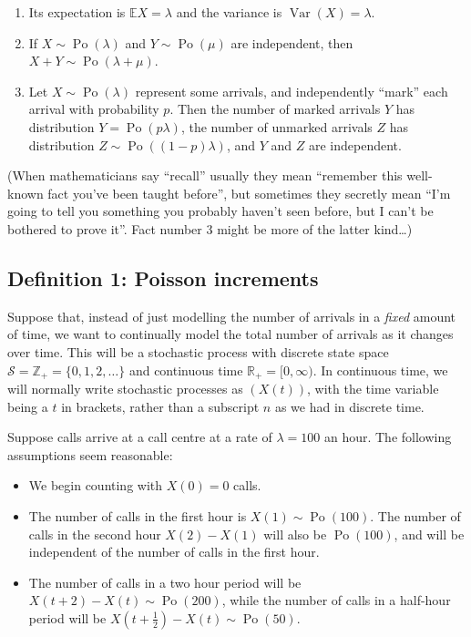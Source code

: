 \documentclass[
  a4paper,
]{article}
\providecommand{\tightlist}{%
  \setlength{\itemsep}{0pt}\setlength{\parskip}{0pt}}
\theoremstyle{definition}
\theoremstyle{definition}
\theoremstyle{definition}
\theoremstyle{remark}
\begin{document}
\begin{enumerate}
\def\labelenumi{\arabic{enumi}.}
\tightlist
\item
  Its expectation is \(\mathbb EX = \lambda\) and the variance is \(\operatorname{Var}(X) = \lambda\).
\item
  If \(X \sim \operatorname{Po}(\lambda)\) and \(Y \sim \operatorname{Po}(\mu)\) are independent, then \(X + Y \sim \operatorname{Po}(\lambda+\mu)\).
\item
  Let \(X \sim \operatorname{Po}(\lambda)\) represent some arrivals, and independently ``mark'' each arrival with probability \(p\). Then the number of marked arrivals \(Y\) has distribution \(Y = \operatorname{Po}(p\lambda)\), the number of unmarked arrivals \(Z\) has distribution \(Z \sim \operatorname{Po}((1-p)\lambda)\), and \(Y\) and \(Z\) are independent.
\end{enumerate}

(When mathematicians say ``recall'' usually they mean ``remember this well-known fact you've been taught before'', but sometimes they secretly mean ``I'm going to tell you something you probably haven't seen before, but I can't be bothered to prove it''. Fact number 3 might be more of the latter kind\ldots)

\hypertarget{poisson-def-poisson}{%
\subsection{Definition 1: Poisson increments}\label{poisson-def-poisson}}

Suppose that, instead of just modelling the number of arrivals in a \emph{fixed} amount of time, we want to continually model the total number of arrivals as it changes over time. This will be a stochastic process with discrete state space \(\mathcal S = \mathbb Z_+ = \{0,1,2,\dots\}\) and continuous time \(\mathbb R_+ = [0,\infty)\). In continuous time, we will normally write stochastic processes as \((X(t))\), with the time variable being a \(t\) in brackets, rather than a subscript \(n\) as we had in discrete time.

Suppose calls arrive at a call centre at a rate of \(\lambda = 100\) an hour. The following assumptions seem reasonable:

\begin{itemize}
\tightlist
\item
  We begin counting with \(X(0) = 0\) calls.
\item
  The number of calls in the first hour is \(X(1) \sim \operatorname{Po}(100)\). The number of calls in the second hour \(X(2) - X(1)\) will also be \(\operatorname{Po}(100)\), and will be independent of the number of calls in the first hour.
\item
  The number of calls in a two hour period will be \(X(t+2) - X(t) \sim \operatorname{Po}(200)\), while the number of calls in a half-hour period will be \(X(t+\frac12) - X(t) \sim \operatorname{Po}(50)\).
\end{itemize}
\end{document}
